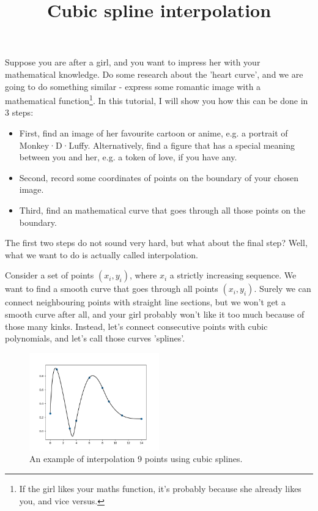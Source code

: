 \documentclass[paper=a4,fontsize=11pt]{scrartcl} %
\title{Cubic spline interpolation}
\begin{document}
\maketitle
Suppose you are after a girl, and you want to impress her with your mathematical knowledge. Do some research about the 'heart curve', and we are going to do something similar - express some romantic image with a mathematical function\footnote{If the girl likes your maths function, it's probably because she already likes you, and vice versus.}. In this tutorial, I will show you how this can be done in 3 steps:

\begin{itemize}
  \item First, find an image of her favourite cartoon or anime, e.g. a portrait of Monkey·D·Luffy. Alternatively, find a figure that has a special meaning between you and her, e.g. a token of love, if you have any.
  \item Second, record some coordinates of points on the boundary of your chosen image.
  \item Third, find an mathematical curve that goes through all those points on the boundary.
\end{itemize}

The first two steps do not sound very hard, but what about the final step? Well, what we want to do is actually called interpolation. 

Consider a set of points $(x_i, y_i)$, where $x_i$ a strictly increasing sequence. We want to find a smooth curve that goes through all points $(x_i, y_i)$. Surely we can connect neighbouring points with straight line sections, but we won't get a smooth curve after all, and your girl probably won't like it too much because of those many kinks. Instead, let's connect consecutive points with cubic polynomials, and let's call those curves 'splines'.

\begin{figure}[h!]
  \centering
  \includegraphics[width=0.5\textwidth]{random_interpolation.png}
  \caption{An example of interpolation 9 points using cubic splines.}
  \label{fig:random_interpolation}
\end{figure}
\end{document}
